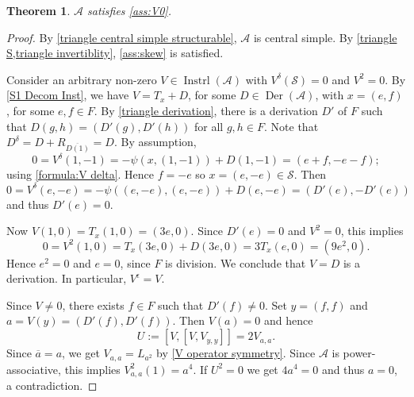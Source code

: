 \documentclass[oneside,a4paper]{amsart} %
\newtheorem{theorem}{Theorem}[section]
\theoremstyle{definition}
\DeclareMathOperator{\Inst}{Instrl}
\DeclareMathOperator{\Der}{Der}
\newcommand{\A}{\mathcal{A}}
\renewcommand{\SS}{\mathcal{S}}
\numberwithin{equation}{section}
\begin{document}
\begin{theorem}
\label{triangle Assumption (i)}
	$\A$ satisfies \cref{ass:V0}.
\end{theorem}
\begin{proof}
	By \cref{triangle central simple structurable}, $\A$ is central simple.
	By \cref{triangle S,triangle invertiblity}, \cref{ass:skew} is satisfied.
	
	Consider an arbitrary non-zero $V\in\Inst (\A)$ with $V^\delta(\SS)=0$ and $V^2=0$.
	By \cref{S1 Decom Inst}, we have $V=T_x+D$, for some $D\in \Der(\A)$, with $x=(e,f)$, for some $e,f\in F$.
	By \cref{triangle derivation}, there is a derivation $D'$ of $F$ such that $D(g,h)=(D'(g),D'(h))$ for all $g,h\in F$.
	Note that $D^\delta=D+R_{\overline{D(1)}}=D$.
	By assumption,
	\[ 0=V^\delta(1,-1)=-\psi(x,(1,-1))+D(1,-1)=(e+f,-e-f) ; \]
	using \cref{formula:V delta}. Hence $f=-e$ so $x = (e, -e) \in \SS$.
	Then
	\[ 0=V^\delta(e,-e)=-\psi((e,-e),(e,-e))+D(e,-e)=(D'(e),-D'(e)) \]
	and thus $D'(e)=0$.
	
	Now $V(1,0)=T_x(1,0)=(3e,0)$.
	Since $D'(e)=0$ and $V^2 = 0$, this implies
	\[ 0 = V^2(1,0) = T_x(3e,0) + D(3e,0) = 3 T_x(e,0) = (9e^2,0) . \]
	Hence $e^2=0$ and $e=0$, since $F$ is division.
	We conclude that $V=D$ is a derivation.
	In particular, $V^\epsilon = V$.
	
	Since $V\neq 0$, there exists $f\in F$ such that $D'(f)\neq 0$.
	Set $y = (f,f)$ and $a = V(y) = (D'(f),D'(f))$.
	Then $V(a) = 0$ and hence
	\[ U:=[V,[V,V_{y,y}]]=2V_{a,a}.\]
	Since $\overline a=a$, we get $V_{a,a} = L_{a^2}$ by \cref{V operator symmetry}. Since $\A$ is power-associative, this implies
	$V_{a,a}^2(1) = a^4$. 
	If $U^2=0$ we get $4a^4=0$ and thus $a=0$, a contradiction.
\end{proof}

\iffalse
\begin{theorem}
\label{triangle Assumption}
	$\A$ satisfies \cref{Assumption}.
\end{theorem}
\begin{proof}
	By \cref{triangle central simple structurable}, $\A$ is central simple.
	By \cref{triangle S,triangle invertiblity}, \cref{ass:skew} is satisfied.
	By \cref{triangle Assumption (i)}, $\A$ satisfies \cref{Assumption}\cref{ass:V0}.
	For \cref{Assumption}\cref{ass:Vasa}, assume that $a \in \A \setminus \{ 0 \}$ is such that $V_{a,sa} = 0$ for all $s \in \SS$.
	Then by \cref{a invertible V_{a,sa}}, $a$ is not conjugate invertible,
	so by \cref{triangle invertiblity} again, $a = (e,0)$ or $a = (0,e)$ for some $e \in F \setminus \{ 0 \}$.
	By \cref{triangle U operator}, we then have $a \in U_a(\A)$.
\end{proof}
\fi
\end{document}
